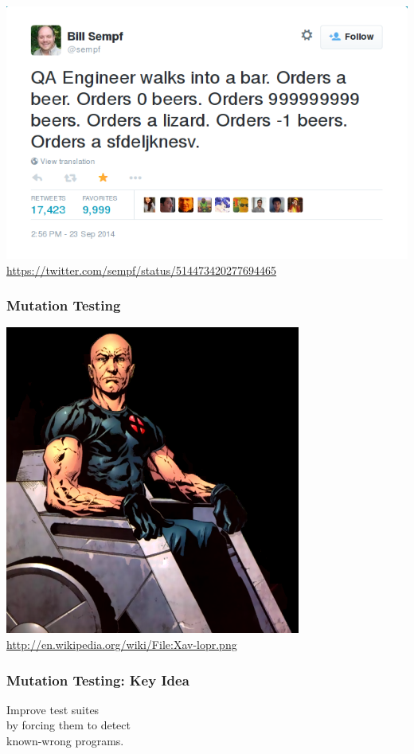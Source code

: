 \documentclass{beamer}
\newenvironment{changemargin}[1]{%
  \begin{list}{}{%
    \setlength{\topsep}{0pt}%
    \setlength{\leftmargin}{#1}%
    \setlength{\rightmargin}{1em}
    \setlength{\listparindent}{\parindent}%
    \setlength{\itemindent}{\parindent}%
    \setlength{\parsep}{\parskip}%
  }%
  \item[]}{\end{list}}
\begin{document}
\begin{frame}
  \begin{center}
  \includegraphics[width=.8\textwidth]{L21/sempf-tweet}
\hfill  \url{https://twitter.com/sempf/status/514473420277694465}
  \end{center}
\end{frame}

\begin{frame}
    \frametitle{Mutation Testing}
  \begin{center}
    \includegraphics[width=.6\textwidth]{L21/Xav-lopr}
    \hfill \url{http://en.wikipedia.org/wiki/File:Xav-lopr.png}
  \end{center}
\end{frame}

\begin{frame}
  \frametitle{Mutation Testing: Key Idea}
  \begin{changemargin}{2cm}
    \Large
    Improve test suites\\ by forcing them to detect \\ known-wrong programs.
  \end{changemargin}
\end{frame}
\end{document}
